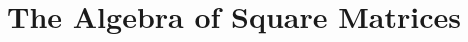 \documentclass[00-livre-main.tex]{subfiles}
\begin{document}
\chapter{The Algebra of Square Matrices}
\end{document}
